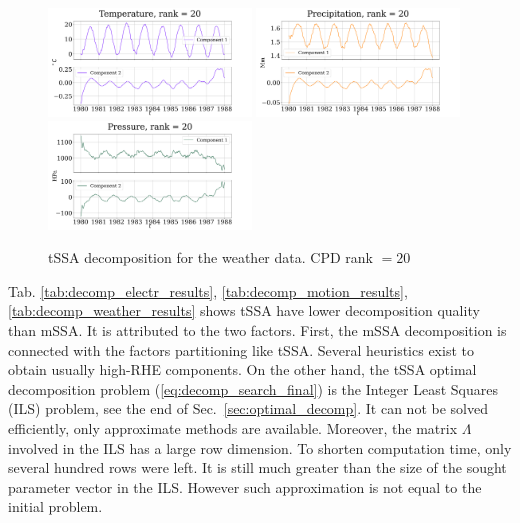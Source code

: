 \documentclass[referee, pdflatex, sn-mathphys-num]{sn-jnl}
\theoremstyle{definition}
\theoremstyle{plain}
\begin{document}
	\begin{figure}[h]
		\centering
		\includegraphics[width=0.48\textwidth, 	keepaspectratio]{Temperature_decomp.png}
		\includegraphics[width=0.48\textwidth, keepaspectratio]{Precipitation_decomp.png}
		\includegraphics[width=0.48\textwidth, keepaspectratio]{Pressure_decomp.png}
		\caption{tSSA decomposition for the weather data. CPD rank $ = 20 $}\label{fig:weather_decomp_tssa}
	\end{figure}
	
	Tab. \ref{tab:decomp_electr_results}, \ref{tab:decomp_motion_results}, \ref{tab:decomp_weather_results} shows tSSA have lower decomposition quality than mSSA. It is attributed to the two factors. First, the mSSA decomposition is connected with the factors partitioning like tSSA. Several heuristics exist to obtain usually high-RHE components. On the other hand, the tSSA optimal decomposition problem (\ref{eq:decomp_search_final}) is the Integer Least Squares (ILS) problem, see the end of Sec.~\ref{sec:optimal_decomp}. It can not be solved efficiently, only approximate methods are available. Moreover, the matrix $ \Lambda $ involved in the ILS has a large row dimension. To shorten computation time, only several hundred rows were left. It is still much greater than the size of the sought parameter vector in the ILS. However such approximation is not equal to the initial problem.
	
\end{document}
